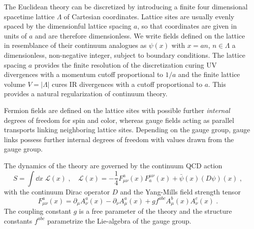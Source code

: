 
The Euclidean theory can be discretized by introducing a finite four dimensional spacetime lattice $\Lambda$ of Cartesian coordinates.
Lattice sites are usually evenly spaced by the dimensionful lattice spacing $a$, so that coordinates are given in units of $a$ and are therefore dimensionless.
We write fields defined on the lattice in resemblance of their continuum analogues as $\psi(x)$ with $x=an$, $n \in \Lambda$ a dimensionless, non-negative integer, subject to boundary conditions.
The lattice spacing $a$ provides the finite resolution of the discretization curing UV divergences with a momentum cutoff proportional to $1/a$ and the finite lattice volume $V = \lvert \Lambda \rvert$ cures IR divergences with a cutoff proportional to $a$.
This provides a natural regularization of continuum theory.

Fermion fields are defined on the lattice sites with possible further \emph{internal} degrees of freedom for spin and color, whereas gauge fields acting as parallel transports linking neighboring lattice sites.
Depending on the gauge group, gauge links possess further internal degrees of freedom with values drawn from the gauge group.

The dynamics of the theory are governed by the continuum QCD action~\cite{yangmills1954}
\begin{equation} \label{eq:continuum:YM:action}
S = \int \dd x \; \mathcal{L}(x) \;,
\quad
\mathcal{L}(x) = - \frac{1}{4} F^{a}_{\mu \nu}(x) F_{a}^{\mu \nu}(x) + \bar{\psi}(x) (D \psi)(x) \;,
\end{equation}
with the continuum Dirac operator $D$ and the Yang-Mills field strength tensor
\begin{equation}
F_{\mu \nu}^{a}(x) = \partial_{\mu} A_{\nu}^{a}(x) -\partial_{\nu} A_{\mu}^{a}(x) + g f^{abc} A_{\mu}^{b}(x) A_{\nu}^{c}(x) \;.
\end{equation}
The coupling constant $g$ is a free parameter of the theory and the structure constants $f^{abc}$ parametrize the Lie-algebra of the gauge group.


